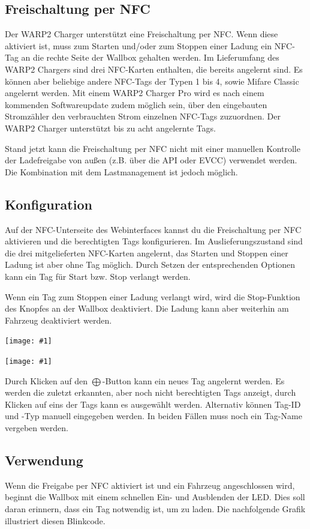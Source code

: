 \documentclass[a4paper,10pt]{article}
\newcommand{\hint}[1]{\begin{tcolorbox}[colback=boxgray,colframe=black,coltext=
white,title=Hinweis]#1\end{tcolorbox}}
\newcommand{\gfx}[1]{\texttt{[image: \#1]}}
\begin{document}
\begin{multicols*}{2}
	\section{Freischaltung per NFC}
	\label{NFC}
	Der WARP2 Charger unterstützt eine Freischaltung per NFC. Wenn diese aktiviert ist,
	muss zum Starten und/oder zum Stoppen einer Ladung ein NFC-Tag an die rechte Seite
	der Wallbox gehalten werden. Im Lieferumfang des WARP2 Chargers sind drei NFC-Karten enthalten,
	die bereits angelernt sind. Es können aber beliebige andere NFC-Tags der Typen 1 bis 4,
	sowie Mifare Classic angelernt werden. Mit einem WARP2 Charger Pro wird es nach einem
	kommenden Softwareupdate zudem möglich sein, über den eingebauten Stromzähler
	den verbrauchten Strom einzelnen NFC-Tags zuzuordnen.
	Der WARP2 Charger unterstützt bis zu acht angelernte Tags.
	\hint{Stand jetzt kann die Freischaltung per NFC nicht mit einer manuellen Kontrolle der
	Ladefreigabe von außen (z.B. über die API oder EVCC) verwendet werden.
	Die Kombination mit dem Lastmanagement ist jedoch möglich.}

	\subsection{Konfiguration}
	Auf der NFC-Unterseite des Webinterfaces kannst du die Freischaltung per NFC aktivieren
	und die berechtigten Tags konfigurieren. Im Auslieferungszustand sind die
	drei mitgelieferten NFC-Karten angelernt, das Starten und Stoppen einer Ladung ist aber ohne Tag möglich.
	Durch Setzen der entsprechenden Optionen kann ein Tag für Start bzw. Stop verlangt werden.
	\hint{Wenn ein Tag zum Stoppen einer Ladung verlangt wird,
	wird die Stop-Funktion des Knopfes an der Wallbox deaktiviert.
	Die Ladung kann aber weiterhin am Fahrzeug deaktiviert werden.}

	\gfx{./img_warp2/resized/web_nfc}

	\gfx{./img_warp2/resized/web_nfc_new}

	Durch Klicken auf den $\bigoplus$-Button kann ein neues Tag angelernt werden.
	Es werden die zuletzt erkannten, aber noch nicht berechtigten Tags anzeigt,
	durch Klicken auf eins der Tags kann es ausgewählt werden. Alternativ können
	Tag-ID und -Typ manuell eingegeben werden. In beiden Fällen muss noch ein Tag-Name vergeben werden.

	\subsection{Verwendung}
	Wenn die Freigabe per NFC aktiviert ist und ein Fahrzeug angeschlossen wird,
	beginnt die Wallbox mit einem schnellen Ein- und Ausblenden der LED.
	Dies soll daran erinnern, dass ein Tag notwendig ist, um zu laden. Die
	nachfolgende Grafik illustriert diesen Blinkcode.


\end{multicols*}
\end{document}
